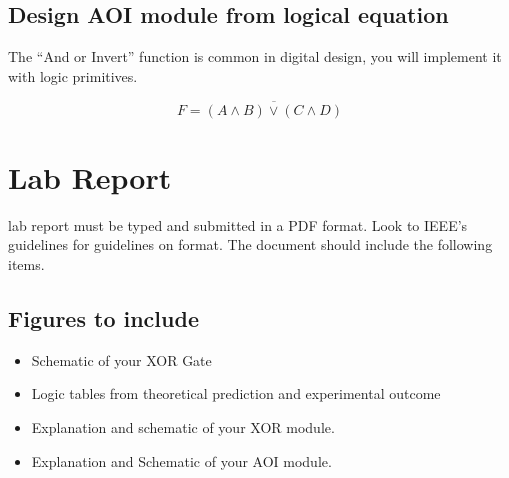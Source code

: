 \documentclass[12pt,journal]{IEEEtran}
\begin{document}
      \subsection{Design AOI module from logical equation} 
      The ``And or Invert'' function is common in digital design, you will implement it with logic primitives.

      \begin{displaymath}
        F = \overline{(A \wedge B) \vee (C \wedge D)}
      \end{displaymath}


  \section{Lab Report}
     lab report must be typed and submitted in a PDF format. Look to IEEE's guidelines for  guidelines on format. The document should include the following items.
    
    \subsection{Figures to include}
    \begin{itemize}
      \item Schematic of your XOR Gate
      \item Logic tables from theoretical prediction and experimental outcome
      \item Explanation and schematic of your XOR module.
      \item Explanation and Schematic of your AOI module.
    \end{itemize}
\end{document}
